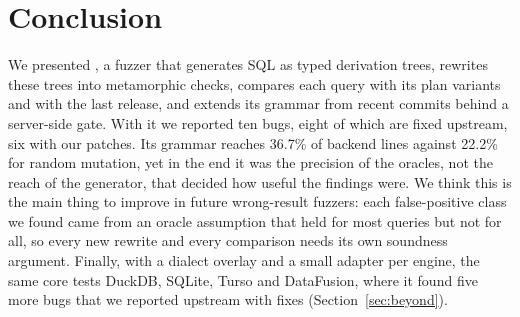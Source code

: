 \section{Conclusion}
\label{sec:conclusion}

We presented \tool, a fuzzer that generates SQL as typed derivation trees,
rewrites these trees into metamorphic checks, compares each query with its plan
variants and with the last release, and extends its grammar from recent commits
behind a server-side gate. With it we reported ten \pg bugs, eight of which are
fixed upstream, six with our patches. Its grammar reaches 36.7\% of backend
lines against 22.2\% for random mutation, yet in the end it was the precision of
the oracles, not the reach of the generator, that decided how useful the
findings were. We think this is the main thing to improve in future
wrong-result fuzzers: each false-positive class we found came from an oracle
assumption that held for most queries but not for all, so every new rewrite and
every comparison needs its own soundness argument. Finally, with a dialect overlay and a small adapter per engine,
the same core tests DuckDB, SQLite, Turso and DataFusion, where it found five
more bugs that we reported upstream with fixes (Section~\ref{sec:beyond}).
